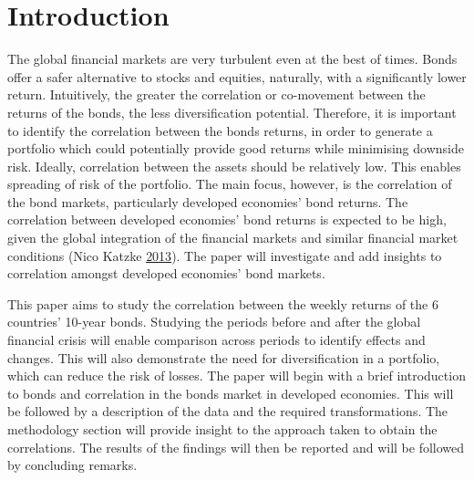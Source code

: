 \documentclass[11pt,preprint, authoryear]{elsarticle}
\numberwithin{equation}{section}
\numberwithin{figure}{section}
\numberwithin{table}{section}
\begin{document}
\pagestyle{fancy}
\chead{}
\lfoot{}
\lhead{}
\cfoot{}


\headsep 35pt %




\section{\texorpdfstring{Introduction
\label{Introduction}}{Introduction }}\label{introduction}

The global financial markets are very turbulent even at the best of
times. Bonds offer a safer alternative to stocks and equities,
naturally, with a significantly lower return. Intuitively, the greater
the correlation or co-movement between the returns of the bonds, the
less diversification potential. Therefore, it is important to identify
the correlation between the bonds returns, in order to generate a
portfolio which could potentially provide good returns while minimising
downside risk. Ideally, correlation between the assets should be
relatively low. This enables spreading of risk of the portfolio. The
main focus, however, is the correlation of the bond markets,
particularly developed economies' bond returns. The correlation between
developed economies' bond returns is expected to be high, given the
global integration of the financial markets and similar financial market
conditions (Nico Katzke \protect\hyperlink{ref-katzke2013}{2013}). The
paper will investigate and add insights to correlation amongst developed
economies' bond markets.

This paper aims to study the correlation between the weekly returns of
the 6 countries' 10-year bonds. Studying the periods before and after
the global financial crisis will enable comparison across periods to
identify effects and changes. This will also demonstrate the need for
diversification in a portfolio, which can reduce the risk of losses. The
paper will begin with a brief introduction to bonds and correlation in
the bonds market in developed economies. This will be followed by a
description of the data and the required transformations. The
methodology section will provide insight to the approach taken to obtain
the correlations. The results of the findings will then be reported and
will be followed by concluding remarks.
\end{document}
